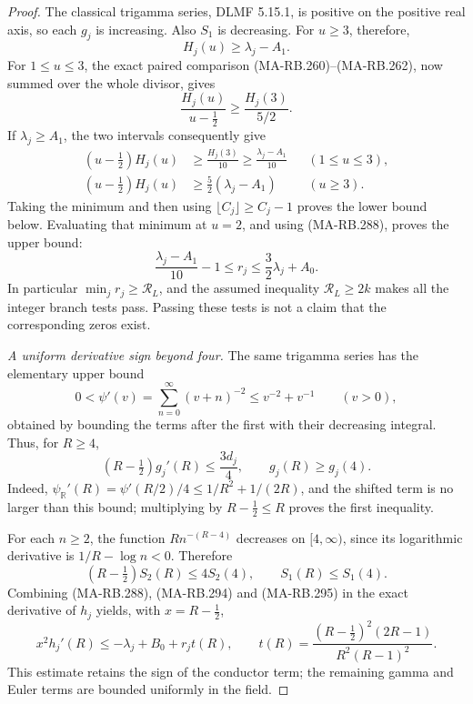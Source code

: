 \begin{proof}
The classical trigamma series, DLMF 5.15.1, is positive
on the positive real axis, so each \(g_j\) is increasing.
Also \(S_1\) is decreasing. For \(u\ge3\), therefore,
\[
                      H_j(u)\ge\lambda_j-A_1.
 \tag{MA-RB.289}
\]
For \(1\le u\le3\), the exact paired comparison
(MA-RB.260)--(MA-RB.262), now summed over the whole divisor,
gives
\[
       \frac{H_j(u)}{u-\tfrac12}\ge\frac{H_j(3)}{5/2}.
 \tag{MA-RB.290}
\]
If \(\lambda_j\ge A_1\), the two intervals consequently
give
\[
 \begin{aligned}
 (u-\tfrac12)H_j(u)&\ge\frac{H_j(3)}{10}
                \ge\frac{\lambda_j-A_1}{10}
                                      &&(1\le u\le3),\\
 (u-\tfrac12)H_j(u)&\ge\frac52(\lambda_j-A_1)
                                      &&(u\ge3).
 \end{aligned}
 \tag{MA-RB.291}
\]
Taking the minimum and then using
\(\lfloor C_j\rfloor\ge C_j-1\) proves the lower bound
below. Evaluating that minimum at \(u=2\), and using
(MA-RB.288), proves the upper bound:
\[
       \frac{\lambda_j-A_1}{10}-1
                    \le r_j\le\frac32\lambda_j+A_0.
 \tag{MA-RB.292}
\]
In particular \(\min_j r_j\ge\mathcal R_L\), and the
assumed inequality \(\mathcal R_L\ge2k\) makes all the
integer branch tests pass. Passing these tests is not
a claim that the corresponding zeros exist.

\emph{A uniform derivative sign beyond four.}
The same trigamma series has the elementary upper bound
\[
 0<\psi'(v)=\sum_{n=0}^{\infty}(v+n)^{-2}
                  \le v^{-2}+v^{-1}\qquad(v>0),
 \tag{MA-RB.293}
\]
obtained by bounding the terms after the first with their
decreasing integral. Thus, for \(R\ge4\),
\[
 (R-\tfrac12)g_j'(R)\le\frac{3d_j}{4},
                          \qquad g_j(R)\ge g_j(4).
 \tag{MA-RB.294}
\]
Indeed, \(\psi_{\mathbb R}'(R)=\psi'(R/2)/4
\le1/R^2+1/(2R)\), and the shifted term is no larger
than this bound; multiplying by \(R-\tfrac12\le R\)
proves the first inequality.

For each \(n\ge2\), the function \(R n^{-(R-4)}\)
decreases on \([4,\infty)\), since its logarithmic
derivative is \(1/R-\log n<0\). Therefore
\[
       (R-\tfrac12)S_2(R)\le4S_2(4),
                           \qquad S_1(R)\le S_1(4).
 \tag{MA-RB.295}
\]
Combining (MA-RB.288), (MA-RB.294) and (MA-RB.295)
in the exact derivative of \(h_j\) yields, with
\(x=R-\tfrac12\),
\[
 x^2h_j'(R)\le-\lambda_j+B_0+r_j t(R),\qquad
 t(R)=\frac{(R-\tfrac12)^2(2R-1)}{R^2(R-1)^2}.
 \tag{MA-RB.296}
\]
This estimate retains the sign of the conductor term;
the remaining gamma and Euler terms are bounded uniformly
in the field.


\end{proof}
